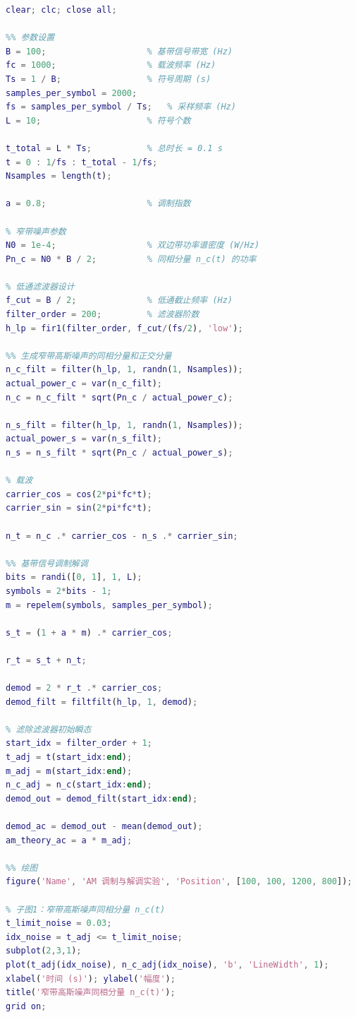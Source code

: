 \documentclass[UTF8]{ctexart}
\begin{document}
\begin{lstlisting}[language = MATLAB]
clear; clc; close all;

%% 参数设置
B = 100;                    % 基带信号带宽 (Hz)
fc = 1000;                  % 载波频率 (Hz)
Ts = 1 / B;                 % 符号周期 (s)
samples_per_symbol = 2000;
fs = samples_per_symbol / Ts;   % 采样频率 (Hz)
L = 10;                     % 符号个数

t_total = L * Ts;           % 总时长 = 0.1 s
t = 0 : 1/fs : t_total - 1/fs;
Nsamples = length(t);

a = 0.8;                    % 调制指数

% 窄带噪声参数
N0 = 1e-4;                  % 双边带功率谱密度 (W/Hz)
Pn_c = N0 * B / 2;          % 同相分量 n_c(t) 的功率

% 低通滤波器设计
f_cut = B / 2;              % 低通截止频率 (Hz)
filter_order = 200;         % 滤波器阶数
h_lp = fir1(filter_order, f_cut/(fs/2), 'low');

%% 生成窄带高斯噪声的同相分量和正交分量
n_c_filt = filter(h_lp, 1, randn(1, Nsamples));
actual_power_c = var(n_c_filt);
n_c = n_c_filt * sqrt(Pn_c / actual_power_c);

n_s_filt = filter(h_lp, 1, randn(1, Nsamples));
actual_power_s = var(n_s_filt);
n_s = n_s_filt * sqrt(Pn_c / actual_power_s);

% 载波
carrier_cos = cos(2*pi*fc*t);
carrier_sin = sin(2*pi*fc*t);

n_t = n_c .* carrier_cos - n_s .* carrier_sin;

%% 基带信号调制解调
bits = randi([0, 1], 1, L);
symbols = 2*bits - 1;
m = repelem(symbols, samples_per_symbol);

s_t = (1 + a * m) .* carrier_cos;

r_t = s_t + n_t;

demod = 2 * r_t .* carrier_cos;
demod_filt = filtfilt(h_lp, 1, demod);

% 滤除滤波器初始瞬态
start_idx = filter_order + 1;
t_adj = t(start_idx:end);
m_adj = m(start_idx:end);
n_c_adj = n_c(start_idx:end);
demod_out = demod_filt(start_idx:end);

demod_ac = demod_out - mean(demod_out);
am_theory_ac = a * m_adj;

%% 绘图
figure('Name', 'AM 调制与解调实验', 'Position', [100, 100, 1200, 800]);

% 子图1：窄带高斯噪声同相分量 n_c(t)
t_limit_noise = 0.03;
idx_noise = t_adj <= t_limit_noise;
subplot(2,3,1);
plot(t_adj(idx_noise), n_c_adj(idx_noise), 'b', 'LineWidth', 1);
xlabel('时间 (s)'); ylabel('幅度');
title('窄带高斯噪声同相分量 n_c(t)');
grid on;


\end{lstlisting}
\end{document}

